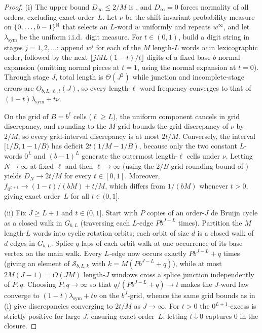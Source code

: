 \documentclass[11pt]{article}
\begin{document}
\begin{proof}
(i) The upper bound $D_\infty\le 2/M$ is , and $D_\infty=0$ forces normality of all orders, excluding exact order~$L$. Let $\nu$ be the shift-invariant probability measure on $\{0,\dots,b-1\}^{\mathbb N}$ that selects an $L$-word $w$ uniformly and repeats $w^\infty$, and let $\lambda_{\mathrm{sym}}$ be the uniform i.i.d.\ digit measure. For $t\in(0,1)$, build a digit string in stages $j=1,2,\dots$: append $w^j$ for each of the $M$ length-$L$ words $w$ in lexicographic order, followed by the next $\lfloor jML(1-t)/t\rfloor$ digits of a fixed base-$b$ normal expansion (omitting normal pieces at $t=1$, using the normal expansion at $t=0$). Through stage $J$, total length is $\Theta(J^2)$ while junction and incomplete-stage errors are $O_{b,L,\ell,t}(J)$, so every length-$\ell$ word frequency converges to that of $(1-t)\lambda_{\mathrm{sym}}+t\nu$.

On the grid of $B=b^\ell$ cells ($\ell\ge L$), the uniform component cancels in grid discrepancy, and rounding to the $M$-grid bounds the grid discrepancy of $\nu$ by $2/M$, so every grid-interval discrepancy is at most $2t/M$. Conversely, the interval $[1/B,1-1/B)$ has deficit $2t(1/M-1/B)$, because only the two constant $L$-words $0^L$ and $(b-1)^L$ generate the outermost length-$\ell$ cells under $\nu$. Letting $N\to\infty$ at fixed $\ell$ and then $\ell\to\infty$ (using the $2/B$ grid-rounding bound of ) yields $D_N\to 2t/M$ for every $t\in[0,1]$. Moreover, $f_{0^{L+1}}\to(1-t)/(bM)+t/M$, which differs from $1/(bM)$ whenever $t>0$, giving exact order~$L$ for all $t\in(0,1]$.

(ii) Fix $J\ge L+1$ and $t\in(0,1]$. Start with $P$ copies of an order-$J$ de Bruijn cycle as a closed walk in $G_{b,L}$ (traversing each $L$-edge $Pb^{J-L}$ times). Partition the $M$ length-$L$ words into cyclic rotation orbits; each orbit of size $d$ is a closed walk of $d$ edges in $G_{b,L}$. Splice $q$ laps of each orbit walk at one occurrence of its base vertex on the main walk. Every $L$-edge now occurs exactly $Pb^{J-L}+q$ times (giving an element of $\mathcal S_{b,L,k}$ with $k=M(Pb^{J-L}+q)$), while at most $2M(J-1)=O(JM)$ length-$J$ windows cross a splice junction independently of $P,q$. Choosing $P,q\to\infty$ so that $q/(Pb^{J-L}+q)\to t$ makes the $J$-word law converge to $(1-t)\lambda_{\mathrm{sym}}+t\nu$ on the $b^J$-grid, whence the same grid bounds as in (i) give discrepancies converging to $2t/M$ as $J\to\infty$. For $t>0$ the $0^{L+1}$-excess is strictly positive for large $J$, ensuring exact order~$L$; letting $t\downarrow0$ captures $0$ in the closure.
\end{proof}
\end{document}
